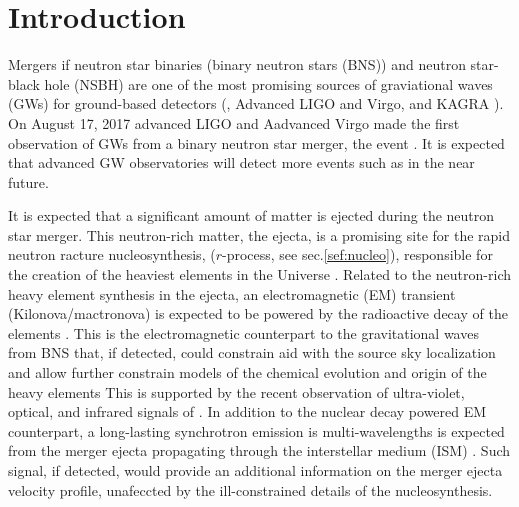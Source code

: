 
\chapter{Introduction} %

\label{ch:intro} %




Mergers if neutron star binaries (binary neutron stars (BNS)) and neutron star-black hole 
(NSBH) are one of the most promising sources of graviational waves (GWs) for ground-based
detectors (\eg, Advanced LIGO and Virgo, and KAGRA \citep{Abadie:2010hv,Accadia:2010aa,Akutsu:2017kpk}).
On August 17, 2017 advanced LIGO and Aadvanced Virgo made the first observation of GWs from a binary 
neutron star merger, the event \GW{}. It is expected that advanced GW observatories will detect more
events such as \GW{} in the near future.

It is expected that a significant amount of matter is ejected during the neutron star merger. 
This neutron-rich matter, the ejecta, is a promising site for the rapid neutron racture 
nucleosynthesis, ($r$-process, see sec.\ref{sef:nucleo}), responsible for the creation of the 
heaviest elements in the Universe \citep{Lattimer:1974slx,Eichler:1989ve,Thielemann:2017acv}.
Related to the neutron-rich heavy element synthesis in the ejecta, an electromagnetic (EM) transient
(Kilonova/mactronova) is expected to be powered by the radioactive decay of the \rproc{} 
elements \citep{Li:1998bw,Metzger:2010,Roberts:2011,Goriely:2011vg,Korobkin:2012uy,Barnes:2013wka,Tanaka:2013ana}.
This is the electromagnetic counterpart to the gravitational waves from BNS that, if detected, 
could constrain aid with the source sky localization and allow further constrain models 
of the chemical evolution and origin of the heavy \rproc{} elements 
This is supported by the recent observation of ultra-violet, optical, and infrared signals of
\GW{} \citep{TheLIGOScientific:2017qsa,Tanaka:2017qxj,Arcavi:2017xiz,Coulter:2017wya,Cowperthwaite:2017dyu,Drout:2017ijr,Evans:2017mmy,Kasliwal:2018fwk,Pian:2017gtc,Smartt:2017fuw,Tanvir:2017pws}. 
In addition to the nuclear decay powered EM counterpart, a long-lasting synchrotron emission 
is multi-wavelengths is expected from the merger ejecta propagating through the interstellar
medium (ISM) \citep{Nakar:2011cw}. 
Such signal, if detected, would provide an additional information on the merger ejecta velocity profile,
unafeccted by the ill-constrained details of the \rproc{} nucleosynthesis. 

